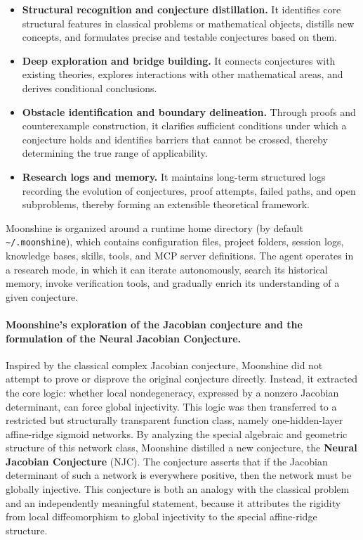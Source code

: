 \documentclass[a4paper,11pt]{article}
\theoremstyle{plain}
\theoremstyle{definition}
\theoremstyle{remark}
\begin{document}
\begin{itemize}[leftmargin=2em]
\item \textbf{Structural recognition and conjecture distillation.} It identifies core structural features in classical problems or mathematical objects, distills new concepts, and formulates precise and testable conjectures based on them.
\item \textbf{Deep exploration and bridge building.} It connects conjectures with existing theories, explores interactions with other mathematical areas, and derives conditional conclusions.
\item \textbf{Obstacle identification and boundary delineation.} Through proofs and counterexample construction, it clarifies sufficient conditions under which a conjecture holds and identifies barriers that cannot be crossed, thereby determining the true range of applicability.
\item \textbf{Research logs and memory.} It maintains long-term structured logs recording the evolution of conjectures, proof attempts, failed paths, and open subproblems, thereby forming an extensible theoretical framework.
\end{itemize}

Moonshine is organized around a runtime home directory (by default \texttt{\textasciitilde/.moonshine}), which contains configuration files, project folders, session logs, knowledge bases, skills, tools, and MCP server definitions. The agent operates in a research mode, in which it can iterate autonomously, search its historical memory, invoke verification tools, and gradually enrich its understanding of a given conjecture.

\paragraph{Moonshine's exploration of the Jacobian conjecture and the formulation of the Neural Jacobian Conjecture.}
Inspired by the classical complex Jacobian conjecture, Moonshine did not attempt to prove or disprove the original conjecture directly. Instead, it extracted the core logic: whether local nondegeneracy, expressed by a nonzero Jacobian determinant, can force global injectivity. This logic was then transferred to a restricted but structurally transparent function class, namely one-hidden-layer affine-ridge sigmoid networks. By analyzing the special algebraic and geometric structure of this network class, Moonshine distilled a new conjecture, the \textbf{Neural Jacobian Conjecture} (NJC). The conjecture asserts that if the Jacobian determinant of such a network is everywhere positive, then the network must be globally injective. This conjecture is both an analogy with the classical problem and an independently meaningful statement, because it attributes the rigidity from local diffeomorphism to global injectivity to the special affine-ridge structure.
\end{document}
